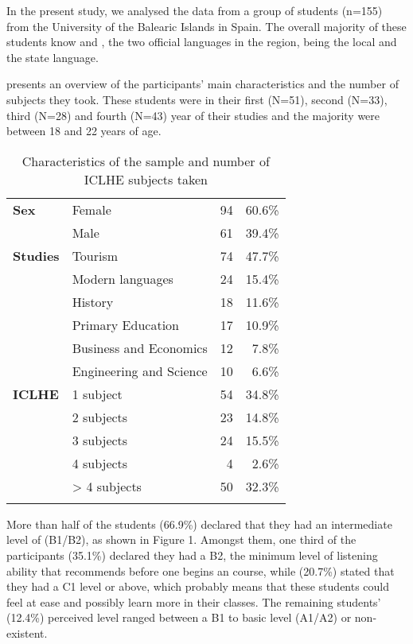 \documentclass[output=paper]{langsci/langscibook}
\begin{document}
In the present study, we analysed the data from a group of students (n=155) from the University of the Balearic Islands in Spain. The overall majority of these students know  and , the two official languages in the region,  being the local and  the state language. 



 presents an overview of the participants' main characteristics and the number of  subjects they took. These students were in their first (N=51), second (N=33), third (N=28) and fourth (N=43) year of their studies and the majority were between 18 and 22 years of age. 


\begin{table}
\caption{Characteristics of the sample and number of ICLHE subjects taken}
\label{tab:moratinos:1}

\begin{tabularx}{\textwidth}{lQrr}
\lsptoprule
{} & \\
 \midrule
 \textbf{Sex}  & Female & 94 & 60.6\%\\
& Male & 61 & 39.4\%\\
\tablevspace
 \textbf{Studies}  & Tourism & 74 & 47.7\%\\
& Modern languages & 24 & 15.4\%\\
& History & 18 & 11.6\%\\
& Primary Education & 17 & 10.9\%\\
& Business and Economics & 12 & 7.8\%\\
& Engineering and Science\par & 10 & 6.6\%\\
 \textbf{ICLHE}  & 1 subject & 54 & 34.8\%\\
& 2 subjects & 23 & 14.8\%\\
& 3 subjects & 24 & 15.5\%\\
& 4 subjects & 4 & 2.6\%\\
& > 4 subjects & 50 & 32.3\%\\
\lspbottomrule
\end{tabularx}
\end{table}

More than half of the students (66.9\%) declared that they had an intermediate level of  (B1/B2), as shown in Figure 1. Amongst them, one third of the participants (35.1\%) declared they had a B2, the minimum level of listening ability that \citet{Breeze2014} recommends before one begins an  course, while (20.7\%) stated that they had a C1 level or above, which probably means that these students could feel at ease and possibly learn more in their classes. The remaining students’ (12.4\%) perceived level ranged between a B1 to basic level (A1/A2) or non-existent. 
\end{document}
